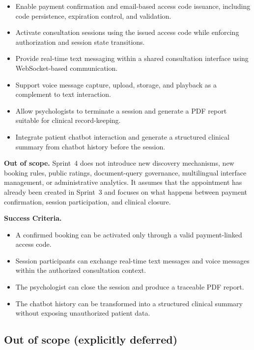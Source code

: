 \documentclass[a4paper,12pt]{report}
\begin{document}
\begin{itemize}[leftmargin=*]
  \item[--] Enable payment confirmation and email-based access code issuance, including code persistence, expiration control, and validation.
  \item[--] Activate consultation sessions using the issued access code while enforcing authorization and session state transitions.
  \item[--] Provide real-time text messaging within a shared consultation interface using WebSocket-based communication.
  \item[--] Support voice message capture, upload, storage, and playback as a complement to text interaction.
  \item[--] Allow psychologists to terminate a session and generate a PDF report suitable for clinical record-keeping.
  \item[--] Integrate patient chatbot interaction and generate a structured clinical summary from chatbot history before the session.
\end{itemize}

\textbf{Out of scope.} Sprint~4 does not introduce new discovery mechanisms, new booking rules, public ratings, document-query governance, multilingual interface management, or administrative analytics. It assumes that the appointment has already been created in Sprint~3 and focuses on what happens between payment confirmation, session participation, and clinical closure.

\textbf{Success Criteria.}
\begin{itemize}[leftmargin=*]
  \item[--] A confirmed booking can be activated only through a valid payment-linked access code.
  \item[--] Session participants can exchange real-time text messages and voice messages within the authorized consultation context.
  \item[--] The psychologist can close the session and produce a traceable PDF report.
  \item[--] The chatbot history can be transformed into a structured clinical summary without exposing unauthorized patient data.
\end{itemize}

\subsection*{Out of scope (explicitly deferred)}
\end{document}
